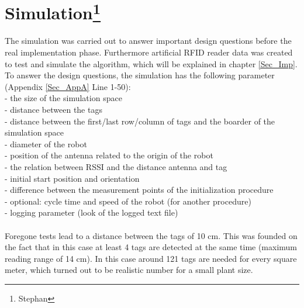 \section[Simulation]{Simulation\footnote{Stephan}} \label{Sec_Sim}
The simulation was carried out to answer important design questions before the real implementation phase. Furthermore artificial RFID reader data was created to test and simulate the algorithm, which will be explained in chapter \ref{Sec_Imp}. \\
To answer the design questions, the simulation has the following parameter (Appendix \ref{Sec_AppA} Line 1-50):\\
- the size of the simulation space\\
- distance between the tags\\
- distance between the first/last row/column of tags and the boarder of the simulation space\\
- diameter of the robot\\
- position of the antenna related to the origin of the robot\\
- the relation between RSSI and the distance antenna and tag\\
- initial start position and orientation\\
- difference between the measurement points of the initialization procedure\\
- optional: cycle time and speed of the robot (for another procedure)\\
- logging parameter (look of the logged text file)\\
\\
Foregone tests lead to a distance between the tags of 10 cm. This was founded on the fact that in this case at least 4 tags are detected at the same time (maximum reading range of 14 cm). In this case around 121 tags are needed for every square meter, which turned out to be realistic number for a small plant size. \\

